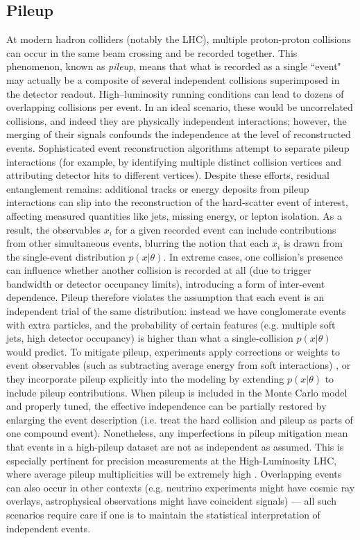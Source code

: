     \subsection{Pileup}
        At modern hadron colliders (notably the LHC), multiple proton-proton collisions can occur in the same beam crossing and be recorded together.
        This phenomenon, known as \emph{pileup}, means that what is recorded as a single ``event" may actually be a composite of several independent collisions superimposed in the detector readout.
        High--luminosity running conditions can lead to dozens of overlapping collisions per event. In an ideal scenario, these would be uncorrelated collisions, and indeed they are physically independent interactions; however, the merging of their signals confounds the independence at the level of reconstructed events. Sophisticated event reconstruction algorithms attempt to separate pileup interactions (for example, by identifying multiple distinct collision vertices and attributing detector hits to different vertices). Despite these efforts, residual entanglement remains: additional tracks or energy deposits from pileup interactions can slip into the reconstruction of the hard-scatter event of interest, affecting measured quantities like jets, missing energy, or lepton isolation. As a result, the observables $x_i$ for a given recorded event can include contributions from other simultaneous events, blurring the notion that each $x_i$ is drawn from the single-event distribution $p(x|\theta)$. In extreme cases, one collision’s presence can influence whether another collision is recorded at all (due to trigger bandwidth or detector occupancy limits), introducing a form of inter-event dependence. Pileup therefore violates the assumption that each event is an independent trial of the same distribution: instead we have conglomerate events with extra particles, and the probability of certain features (e.g. multiple soft jets, high detector occupancy) is higher than what a single-collision $p(x|\theta)$ would predict. To mitigate pileup, experiments apply corrections or weights to event observables (such as subtracting average energy from soft interactions) , or they incorporate pileup explicitly into the modeling by extending $p(x|\theta)$ to include pileup contributions. When pileup is included in the Monte Carlo model and properly tuned, the effective independence can be partially restored by enlarging the event description (i.e. treat the hard collision and pileup as parts of one compound event). Nonetheless, any imperfections in pileup mitigation mean that events in a high-pileup dataset are not as independent as assumed. This is especially pertinent for precision measurements at the High-Luminosity LHC, where average pileup multiplicities will be extremely high . Overlapping events can also occur in other contexts (e.g. neutrino experiments might have cosmic ray overlays, astrophysical observations might have coincident signals) — all such scenarios require care if one is to maintain the statistical interpretation of independent events.
